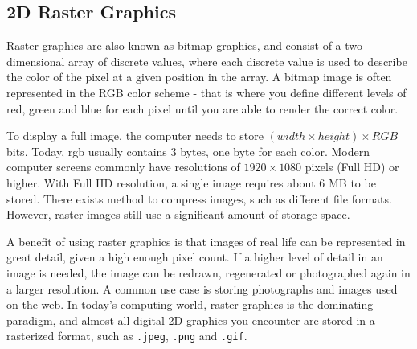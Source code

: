 \subsection{2D Raster Graphics}
Raster graphics are also known as bitmap graphics, and consist of a two-dimensional array of discrete values, where each discrete value is used to describe the color of the pixel at a given position in the array.
A bitmap image is often represented in the RGB color scheme - that is where you define different levels of red, green and blue for each pixel until you are able to render the correct color.

To display a full image, the computer needs to store \( (width \times height) \times RGB \) bits.
Today, \gls{rgb} usually contains 3 bytes, one byte for each color.
Modern computer screens commonly have resolutions of \(1920 \times 1080\) pixels (Full HD) or higher.
With Full HD resolution, a single image requires about 6 MB to be stored.
There exists method to compress images, such as different file formats.
However, raster images still use a significant amount of storage space.

A benefit of using raster graphics is that images of real life can be represented in great detail, given a high enough pixel count.
If a higher level of detail in an image is needed, the image can be redrawn, regenerated or photographed again in a larger resolution.
A common use case is storing photographs and images used on the web.
In today's computing world, raster graphics is the dominating paradigm, and almost all digital 2D graphics you encounter are stored in a rasterized format, such as \texttt{.jpeg}, \texttt{.png} and \texttt{.gif}.
